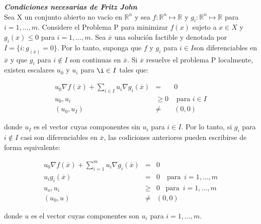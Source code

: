 {\teorema \textbf{\itshape Condiciones necesarias de Fritz John \cite{no-lineal}}\\
Sea X un conjunto abierto no vac\'io en $\mathbb{R}^n$ y sea $f: \mathbb{R}^n \longmapsto \mathbb{R}$ y 
$g_i : \mathbb{R}^n \longmapsto \mathbb{R}$ para $i = 1, \ldots , m.$ Considere el  Problema P para minimizar $f(x)$ sujeto a $x \in X$ y 
$g_i(x) \leqslant 0$ para $i = 1, \ldots , m.$ Sea $\overline{x}$ una soluci\'on factible  y denotada por $I = \{i: g_(\overline{x}) = 0\}.$
Por lo tanto, suponga que $f $ y $ g_i $ para $ i \in I $son diferenciables en $ \overline{x} $ y que $ g_i $ para $ i \notin I $ son
continuas en $\overline{x}. $ Si $ \overline{x} $ resuelve el problema P localmente, existen escalares $u_0 $ y $u_i$ para $\i \in I$ tales 
que:

\begin{eqnarray*}
   u_0 \nabla f(\overline{x}) +  \sum_{i \in I} u_i \nabla g_i (\overline{x}) & = & 0\\
   u_0, u_i & \geqslant  0  & \mbox{ para  } i\in I\\
   (u_0, u_I) & \neq & (0, 0)
\end{eqnarray*}

donde $ u_I $ es el vector cuyas componentes sin $u_i$ para $i \in I.$ Por lo tanto, si $g_i$ para $i \notin I$ casi son diferenciables en
$\overline{x}$, las codiciones anteriores pueden escribirse de forma equivalente:

\begin{eqnarray*}
   u_0 \nabla f(\overline{x}) +  \sum_{i =1}^{m} u_i \nabla g_i (\overline{x}) & = & 0\\
   u_i g_i(\overline{x}) & = & 0\,\,\,\, \mbox{ para  }\, i=1, \ldots , m\\
   u_o, u_i & \geqslant & 0\,\,\, \mbox{ para  }\, i=1, \ldots , m\\
   (u_0, u) & \neq & (0, 0)
\end{eqnarray*}

donde $u$ es el vector cuyas componentes son $u_i $ para $ i=1, \ldots , m. $ \label{fritz-nec}}
\medskip

